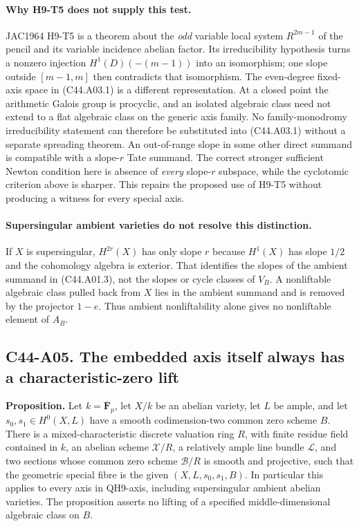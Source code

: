 \documentclass[11pt]{article}
\theoremstyle{remark}\newtheorem{remark}[theorem]{Remark}
\begin{document}
\paragraph{Why H9-T5 does not supply this test.}
JAC1964 H9-T5 is a theorem about the \emph{odd} variable local
system $R^{2m-1}$ of the pencil and its variable incidence abelian
factor. Its irreducibility hypothesis turns a nonzero injection
$H^1(D)(-(m-1))$ into an isomorphism; one slope outside
$[m-1,m]$ then contradicts that isomorphism. The even-degree
fixed-axis space in (C44.A03.1) is a different representation.
At a closed point the arithmetic Galois group is procyclic, and
an isolated algebraic class need not extend to a flat algebraic
class on the generic axis family. No family-monodromy
irreducibility statement can therefore be substituted into
(C44.A03.1) without a separate spreading theorem.
An out-of-range slope in some other direct summand is compatible
with a slope-$r$ Tate summand. The correct stronger sufficient
Newton condition here is absence of \emph{every} slope-$r$
subspace, while the cyclotomic criterion above is sharper.
This repairs the proposed use of H9-T5 without producing a
witness for every special axis.

\paragraph{Supersingular ambient varieties do not resolve this distinction.}
If $X$ is supersingular, $H^{2r}(X)$ has only slope $r$ because
$H^1(X)$ has slope $1/2$ and the cohomology algebra is exterior.
That identifies the slopes of the ambient summand in
(C44.A01.3), not the slopes or cycle classes of $V_B$.
A nonliftable algebraic class pulled back from $X$ lies in the
ambient summand and is removed by the projector $1-e$. Thus
ambient nonliftability alone gives no nonliftable element of
$A_B$.

\subsection*{C44-A05. The embedded axis itself always has a characteristic-zero lift}

\textbf{Proposition.}
Let $k=\overline{\mathbf F}_p$, let $X/k$ be an abelian variety,
let $L$ be ample, and let $s_0,s_1\in H^0(X,L)$ have a smooth
codimension-two common zero scheme $B$. There is a mixed-characteristic
discrete valuation ring $R$, with finite residue field contained in $k$,
an abelian scheme $\mathcal X/R$, a relatively ample line bundle
$\mathcal L$, and two sections whose common zero scheme
$\mathcal B/R$ is smooth and projective, such that the geometric
special fibre is the given $(X,L,s_0,s_1,B)$. In particular this
applies to every axis in QH9-axis, including supersingular ambient
abelian varieties. The proposition asserts no lifting of a specified
middle-dimensional algebraic class on $B$.
\end{document}
